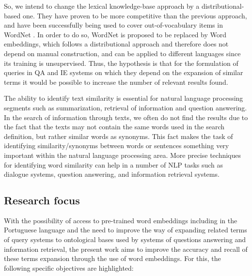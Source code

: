 So, we intend to change the lexical knowledge-base approach by a distributional-based one. They have proven to be more competitive than the previous approach, and have been successfully being used to cover out-of-vocabulary items in WordNet \cite{gonccalo2018distributional, Agirre2009}.
In order to do so, WordNet is proposed to be replaced by Word embeddings, which follows a distributional approach and therefore does not depend on manual construction, and can be applied to different languages since its training is unsupervised. Thus, the hypothesis is that for the formulation of queries in QA and IE systems on which they depend on the expansion of similar terms it would be possible to increase the number of relevant results found.

The ability to identify text similarity is essential for natural language processing segments such as summarization, retrieval of information and question answering. In the search of information through texts, we often do not find the results due to the fact that the texts may not contain the same words used in the search definition, but rather similar words as synonyms. This fact makes the task of identifying similarity/synonyms between words or sentences something very important within the natural language processing area. More precise techniques for identifying word similarity can help in a number of NLP tasks such as dialogue systems, question answering, and information retrieval systems. \cite{gonccalo2018distributional, Pilehvar2013, Agirre2009, Islam2007ApplicationsOC}


\subsection{Research focus}

With the possibility of access to pre-trained word embeddings including in the Portuguese language and the need to improve the way of expanding related terms of query systems to ontological bases used by systems of questions answering and information retrieval, the present work aims to improve the accuracy and recall of these terms expansion through the use of word embeddings. For this, the following specific objectives are highlighted:

